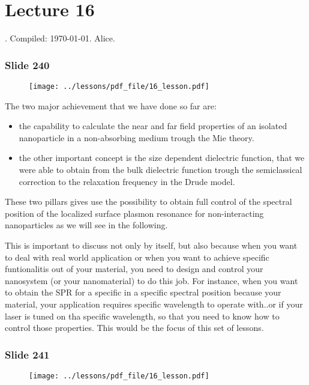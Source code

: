 \documentclass[../main/main.tex]{subfiles}
\begin{document}
\section{Lecture 16}
. Compiled:  \today. Alice.

\subsubsection{Slide 240}

\begin{figure}[h!]
\centering
\texttt{[image: ../lessons/pdf\_file/16\_lesson.pdf]}
\end{figure}

The two major achievement that we have done so far are:
\begin{itemize}
\item the capability to calculate the near and far field properties of an isolated nanoparticle in a non-absorbing medium trough the Mie theory.

\item the other important concept is the size dependent dielectric function, that we were able to obtain from the bulk dielectric function trough the semiclassical correction to the relaxation frequency in the Drude model.
\end{itemize}
These two pillars gives use the possibility to obtain full control of the spectral position of the localized surface plasmon resonance for non-interacting nanoparticles as we will see in the following.

This is important to discuss not only by itself, but also because when you want to deal with real world application or when you want to achieve specific funtionalitis out of your material, you need to design and control your nanosystem (or your nanomaterial) to do this job. For instance, when you want to obtain the SPR for a specific in a specific spectral position because your material, your application requires specific wavelength to operate with..or if your laser is tuned on tha specific wavelength, so that you need to know how to control those properties.
This would be the focus of this set of lessons.


\newpage

\subsubsection{Slide 241}

\begin{figure}[h!]
\centering
\texttt{[image: ../lessons/pdf\_file/16\_lesson.pdf]}
\end{figure}
\end{document}
